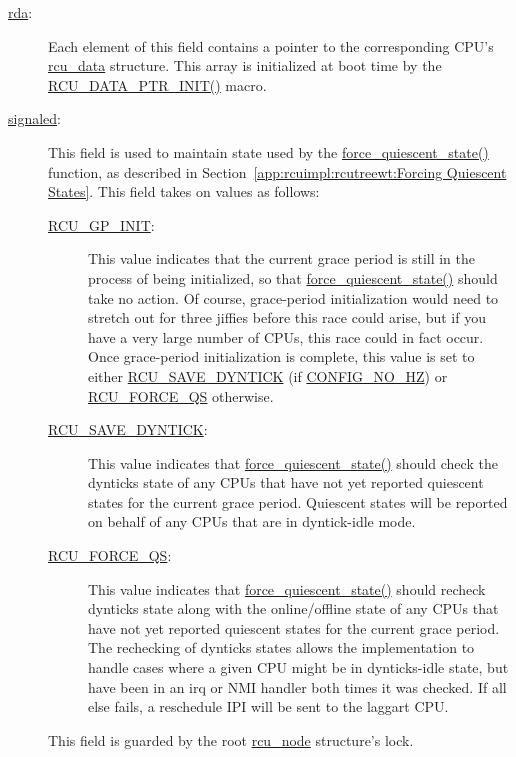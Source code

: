 \begin{description}
\item[\url{rda}:]
	Each element of this field contains a pointer to the
	corresponding CPU's \url{rcu_data} structure.
	This array is initialized at boot time by the
	\url{RCU_DATA_PTR_INIT()} macro.
\item[\url{signaled}:]
	This field is used to maintain state used by the
	\url{force_quiescent_state()} function, as described in
	Section~\ref{app:rcuimpl:rcutreewt:Forcing Quiescent States}.
	This field takes on values as follows:
	\begin{description}
	\item[\url{RCU_GP_INIT}:]
		This value indicates that the current grace period
		is still in the process of being initialized,
		so that \url{force_quiescent_state()} should take
		no action.
		Of course, grace-period initialization would need
		to stretch out for three jiffies before this race
		could arise, but if you have a very large number
		of CPUs, this race could in fact occur.
		Once grace-period initialization is complete,
		this value is set to either \url{RCU_SAVE_DYNTICK}
		(if \url{CONFIG_NO_HZ}) or \url{RCU_FORCE_QS} otherwise.
	\item[\url{RCU_SAVE_DYNTICK}:]
		This value indicates that \url{force_quiescent_state()}
		should check the dynticks state of any CPUs that have
		not yet reported quiescent states for the current
		grace period.
		Quiescent states will be reported on behalf of any
		CPUs that are in dyntick-idle mode.
	\item[\url{RCU_FORCE_QS}:]
		This value indicates that \url{force_quiescent_state()}
		should recheck dynticks state along with the online/offline
		state of any CPUs that have
		not yet reported quiescent states for the current
		grace period.
		The rechecking of dynticks states allows the implementation
		to handle cases where a given CPU might be in dynticks-idle
		state, but have been in an irq or NMI handler both
		times it was checked.
		If all else fails, a reschedule IPI will be sent to
		the laggart CPU.
	\end{description}
	This field is guarded by the root \url{rcu_node} structure's lock.

 \QuickQuizEnd


\end{description}
